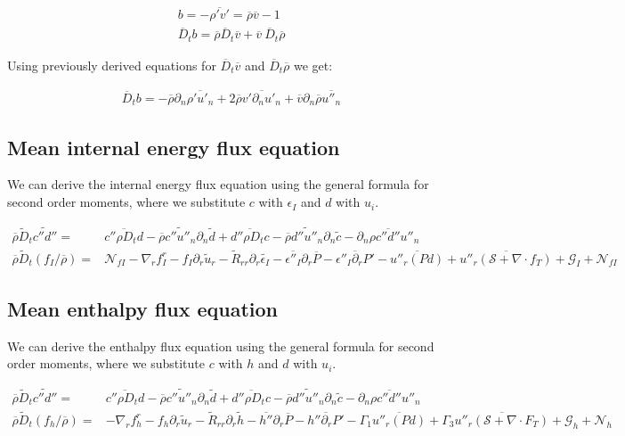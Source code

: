 \documentclass[10pt,paper=a4]{report}
\newcommand{\eht}{\overline}
\newcommand{\fht}{\widetilde}
\newcommand{\fav}{\widetilde}
\def\erho{\eht{\rho}}
\begin{document}
\begin{align}
b = -\eht{\rho'v'} = \eht{\rho}\eht{v} - 1 \\
\eht{D}_t b = \eht{\rho}\eht{D}_t \eht{v} + \eht{v} \ \eht{D}_t \eht{\rho} 
\end{align}

Using previously derived equations for $\eht{D}_t \eht{v}$ and $\eht{D}_t \eht{\rho}$ we get:

\begin{align}
\eht{D}_t b = -\eht{\rho}\partial_n \eht{\rho' u'_n} + 2 \eht{\rho}\eht{v'\partial_n u'_n} + \eht{v}\partial_n \eht{\rho} \eht{u''_n}
\end{align}

\subsection{Mean internal energy flux equation}

We can derive the internal energy flux equation using the general formula for second order moments, where we substitute $c$ with  $\epsilon_I$ and $d$ with $u_i$.

\begin{align}
\overline{\rho}\widetilde{D}_t \widetilde{c''d''} = & \overline{c'' \rho D_t d} - \overline{\rho} \widetilde{c''u''_n}\partial_n \widetilde{d} + \overline{d'' \rho D_t c} - \overline{\rho} \widetilde{d''u''_n}\partial_n \widetilde{c} - \overline{\partial_n \rho c''d''u''_n} \\
\erho \fav{D}_t (f_I / \eht{\rho}) = &  {\mathcal N_{fI}} -\nabla_r f_I^r  - f_I \partial_r \fht{u}_r  - \fht{R}_{rr} \partial_r \fht{\epsilon_I} - \eht{\epsilon''_I} \partial_r \eht{P} - \eht{\epsilon''_I \partial_r P'}  - \eht{u''_r \left( P d \right)}  + \overline{u''_r ({\mathcal S} + \nabla \cdot f_T)} + {\mathcal G_I} + {\mathcal N_{fI}}\label{eq:rans_fi}
\end{align}

\subsection{Mean enthalpy flux equation}

We can derive the enthalpy flux equation using the general formula for second order moments, where we substitute $c$ with  $h$ and $d$ with $u_i$.

\begin{align}
\overline{\rho}\widetilde{D}_t \widetilde{c''d''} = & \overline{c'' \rho D_t d} - \overline{\rho} \widetilde{c''u''_n}\partial_n \widetilde{d} + \overline{d'' \rho D_t c} - \overline{\rho} \widetilde{d''u''_n}\partial_n \widetilde{c} - \overline{\partial_n \rho c''d''u''_n} \\
\erho \fav{D}_t (f_h / \eht{\rho}) = &  -\nabla_r f_h^r - f_h \partial_r \fht{u}_r - \fht{R}_{rr} \partial_r \fht{h} -\eht{h''}\partial_r \eht{P} - \eht{h''\partial_r P'} - \Gamma_1\eht{u''_r \left( P d \right) } + \Gamma_3 \overline{u''_r ({\mathcal S} + \nabla \cdot F_T)} + {\mathcal G_h} + {\mathcal N_{h \ }} \label{eq:rans_fh} 
\end{align}
\end{document}
